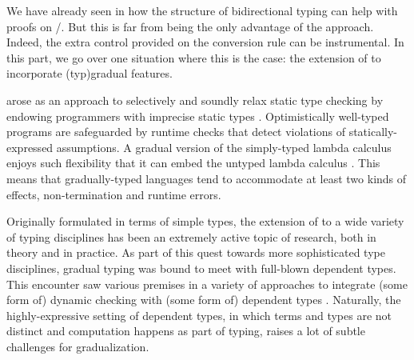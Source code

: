 We have already seen in  how the structure of bidirectional typing can
help with proofs on /. But this is far from being the only advantage of
the approach. Indeed, the extra control provided on the conversion rule can be instrumental.
In this part, we go over one situation where this is the case: the extension of  to
incorporate \kl(typ){gradual} features.

 arose as an approach to selectively and soundly relax static type
checking by endowing programmers with imprecise static
types . Optimistically well-typed
programs are safeguarded by runtime checks that detect violations of
statically-expressed assumptions. A gradual version of the simply-typed lambda
calculus enjoys such flexibility that it can embed the untyped lambda
calculus \cite{Siek2015}.
This means that gradually-typed languages tend to accommodate at least
two kinds of effects, non-termination and runtime errors.

Originally formulated in terms of simple types, the extension of 
to a wide variety of typing disciplines has been an extremely active topic of
research, both in theory and in practice. As part of this quest towards more
sophisticated type disciplines, gradual typing was bound to meet with full-blown
dependent types. This encounter saw various premises in a variety of approaches
to integrate (some form of) dynamic checking with (some form of) dependent
types .
Naturally, the highly-expressive setting of dependent types, in which terms and
types are not distinct and computation happens as part of typing, raises a lot
of subtle challenges for gradualization.

